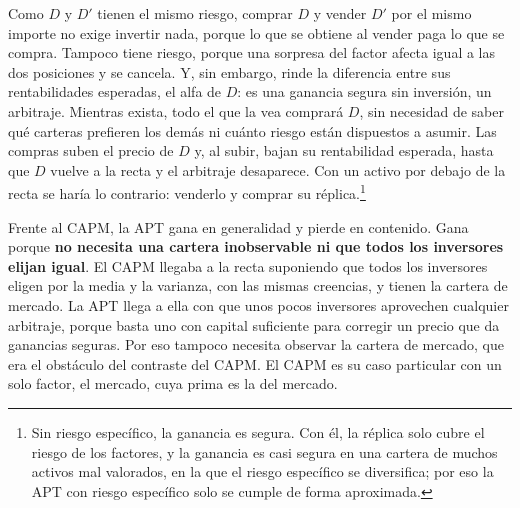 \documentclass[10pt,a4paper]{article}
\begin{document}
Como $D$ y $D'$ tienen el mismo riesgo, comprar $D$ y vender $D'$ por el mismo importe no exige invertir nada, porque lo que se obtiene al vender paga lo que se compra. Tampoco tiene riesgo, porque una sorpresa del factor afecta igual a las dos posiciones y se cancela. Y, sin embargo, rinde la diferencia entre sus rentabilidades esperadas, el alfa de $D$: es una ganancia segura sin inversión, un arbitraje. Mientras exista, todo el que la vea comprará $D$, sin necesidad de saber qué carteras prefieren los demás ni cuánto riesgo están dispuestos a asumir. Las compras suben el precio de $D$ y, al subir, bajan su rentabilidad esperada, hasta que $D$ vuelve a la recta y el arbitraje desaparece. Con un activo por debajo de la recta se haría lo contrario: venderlo y comprar su réplica.\footnote{%
    Sin riesgo específico, la ganancia es segura. Con él, la réplica solo cubre el riesgo de los factores, y la ganancia es casi segura en una cartera de muchos activos mal valorados, en la que el riesgo específico se diversifica; por eso la APT con riesgo específico solo se cumple de forma aproximada.
}

Frente al CAPM, la APT gana en generalidad y pierde en contenido. Gana porque \textbf{no necesita una cartera inobservable ni que todos los inversores elijan igual}. El CAPM llegaba a la recta suponiendo que todos los inversores eligen por la media y la varianza, con las mismas creencias, y tienen la cartera de mercado. La APT llega a ella con que unos pocos inversores aprovechen cualquier arbitraje, porque basta uno con capital suficiente para corregir un precio que da ganancias seguras. Por eso tampoco necesita observar la cartera de mercado, que era el obstáculo del contraste del CAPM. El CAPM es su caso particular con un solo factor, el mercado, cuya prima es la del mercado.
\end{document}
